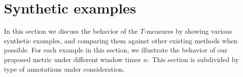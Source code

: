 \documentclass{article}
\begin{document}





\section{Synthetic examples}\label{sec:examples}

In this section we discuss the behavior of the $T$-measures by showing various synthetic examples, and comparing them against other existing methods when possible.
For each example in this section, we illustrate the behavior of our proposed metric under different window times $w$.
This section is subdivided by type of annotations under consideration.
\end{document}
